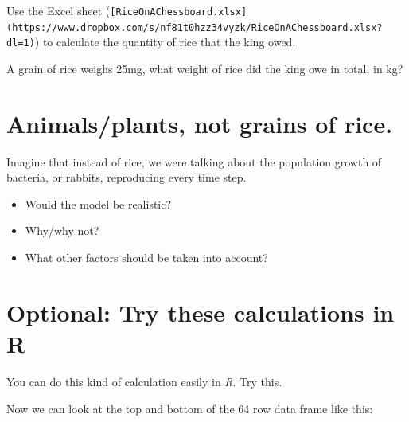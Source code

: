 \documentclass[
  a4paper]{book}
\newenvironment{Shaded}{\begin{snugshade}}{\end{snugshade}}
\newcommand{\AttributeTok}[1]{\textcolor[rgb]{0.13,0.29,0.53}{#1}}
\newcommand{\ConstantTok}[1]{\textcolor[rgb]{0.56,0.35,0.01}{#1}}
\newcommand{\ControlFlowTok}[1]{\textcolor[rgb]{0.13,0.29,0.53}{\textbf{#1}}}
\newcommand{\DecValTok}[1]{\textcolor[rgb]{0.00,0.00,0.81}{#1}}
\newcommand{\FunctionTok}[1]{\textcolor[rgb]{0.13,0.29,0.53}{\textbf{#1}}}
\newcommand{\NormalTok}[1]{#1}
\newcommand{\OtherTok}[1]{\textcolor[rgb]{0.56,0.35,0.01}{#1}}
\newcommand{\SpecialCharTok}[1]{\textcolor[rgb]{0.81,0.36,0.00}{\textbf{#1}}}
\providecommand{\tightlist}{%
  \setlength{\itemsep}{0pt}\setlength{\parskip}{0pt}}
\begin{document}
Use the Excel sheet (\texttt{{[}RiceOnAChessboard.xlsx{]}(https://www.dropbox.com/s/nf81t0hzz34vyzk/RiceOnAChessboard.xlsx?dl=1)}) to calculate the quantity of rice that the king owed.

A grain of rice weighs 25mg, what weight of rice did the king owe in total, in kg?

\section{Animals/plants, not grains of rice.}\label{animalsplants-not-grains-of-rice.}

Imagine that instead of rice, we were talking about the population growth of bacteria, or rabbits, reproducing every time step.

\begin{itemize}
\tightlist
\item
  Would the model be realistic?
\item
  Why/why not?
\item
  What other factors should be taken into account?
\end{itemize}

\section{Optional: Try these calculations in R}\label{optional-try-these-calculations-in-r}

You can do this kind of calculation easily in \emph{R}. Try this.

\begin{Shaded}
\end{Shaded}

Now we can look at the top and bottom of the 64 row data frame like this:
\end{document}

